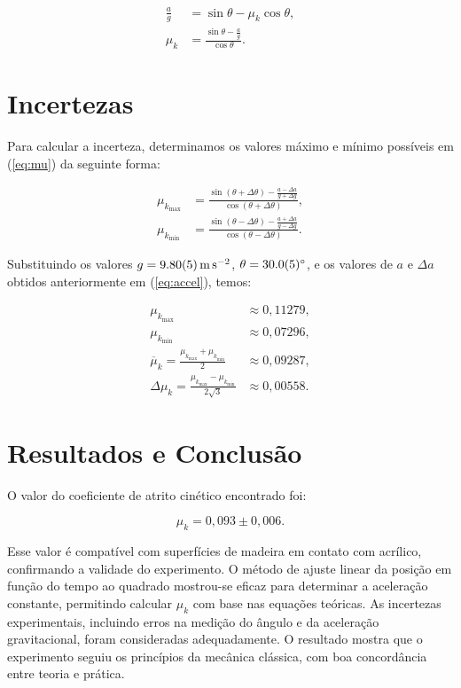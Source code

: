 \documentclass[10pt,oneside,twocolumn,a4paper]{article}
\begin{document}
\begin{align}\label{eq:mu}
	\frac{a}{g} &= \sin\theta - \mu_k \cos\theta, \nonumber \\
	\mu_k &= \frac{\sin\theta - \frac{a}{g}}{\cos\theta}.
\end{align}

\section{Incertezas}

Para calcular a incerteza, determinamos os valores máximo e mínimo possíveis em
(\ref{eq:mu}) da seguinte forma:

\begin{align*}
	\mu_{k_\text{max}} &= \frac{\sin(\theta + \Delta\theta) - \frac{a - \Delta a}{g + \Delta g}}{\cos(\theta + \Delta\theta)}, \\
	\mu_{k_\text{min}} &= \frac{\sin(\theta - \Delta\theta) - \frac{a + \Delta a}{g - \Delta g}}{\cos(\theta - \Delta\theta)}.
\end{align*}


Substituindo os valores $g = \SI{9.8 \pm 0.05}{\meter\per\second\squared}$,
$\theta = \SI{30 \pm 0.5}{\degree}$, e os valores de $a$ e $\Delta a$ obtidos
anteriormente em (\ref{eq:accel}), temos:

\begin{align*}
	\mu_{k_\text{max}} &\approx 0,11279, \\
	\mu_{k_\text{min}} &\approx 0,07296, \\
	\overline\mu_k = \frac{\mu_{k_\text{max}} + \mu_{k_\text{min}}}{2} &\approx 0,09287, \\
	\Delta\mu_k = \frac{\mu_{k_\text{max}} - \mu_{k_\text{min}}}{2\sqrt{3}} &\approx 0,00558.
\end{align*}

\section{Resultados e Conclusão}

O valor do coeficiente de atrito cinético encontrado foi:

\begin{equation*}
	\mu_k = 0,093 \pm 0,006.
\end{equation*}

Esse valor é compatível com superfícies de madeira em contato com acrílico,
confirmando a validade do experimento. O método de ajuste linear da posição em
função do tempo ao quadrado mostrou-se eficaz para determinar a aceleração
constante, permitindo calcular $\mu_k$ com base nas equações teóricas. As
incertezas experimentais, incluindo erros na medição do ângulo e da aceleração
gravitacional, foram consideradas adequadamente. O resultado mostra que o
experimento seguiu os princípios da mecânica clássica, com boa concordância
entre teoria e prática.
\end{document}
